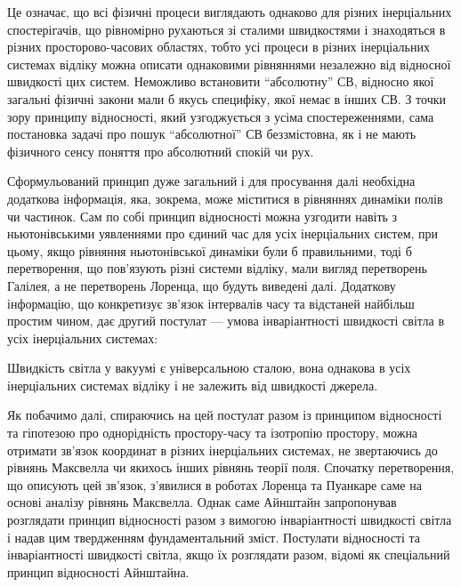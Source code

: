 Це означає, що всі фізичні процеси виглядають однаково для різних інерціальних спостерігачів, що рівномірно рухаються зі сталими швидкостями і знаходяться в різних просторово-часових областях, тобто усі процеси в різних інерціальних системах відліку можна описати однаковими рівняннями незалежно від відносної швидкості цих систем. Неможливо встановити ``абсолютну'' СВ, відносно якої загальні фізичні закони мали б якусь специфіку, якої немає в інших СВ. З точки зору принципу відносності, який узгоджується з усіма спостереженнями, сама постановка задачі про пошук ``абсолютної'' СВ беззмістовна, як і не мають фізичного сенсу поняття про абсолютний спокій чи рух.

Сформульований принцип дуже загальний і для просування далі необхідна додаткова інформація, яка, зокрема, може міститися в рівняннях динаміки полів чи частинок. Сам по собі принцип відносності можна узгодити навіть з ньютонівськими уявленнями про єдиний час для усіх інерціальних систем, при цьому, якщо рівняння ньютонівської динаміки були б правильними, тоді б перетворення, що пов'язують різні системи відліку, мали вигляд перетворень Галілея, а не перетворень Лоренца, що будуть виведені далі. Додаткову інформацію, що конкретизує зв'язок інтервалів часу та відстаней найбільш простим чином, дає другий постулат --- умова інваріантності швидкості світла в усіх інерціальних системах:

\begin{postulate}{}
Швидкість світла у вакуумі є універсальною сталою, вона однакова в усіх інерціальних системах відліку і не залежить від швидкості джерела.
\end{postulate}

Як побачимо далі, спираючись на цей постулат разом із принципом відносності та гіпотезою про однорідність простору-часу та ізотропію простору, можна отримати зв'язок координат в різних інерціальних системах, не звертаючись до рівнянь Максвелла чи якихось інших рівнянь теорії поля. Спочатку перетворення, що описують цей зв'язок, з'явилися в роботах Лоренца та Пуанкаре саме на основі аналізу рівнянь Максвелла. Однак саме Айнштайн запропонував розглядати принцип відносності разом з вимогою інваріантності швидкості світла і надав цим твердженням фундаментальний зміст. Постулати відносності та інваріантності швидкості світла, якщо їх розглядати разом, відомі як спеціальний принцип відносності Айнштайна.

